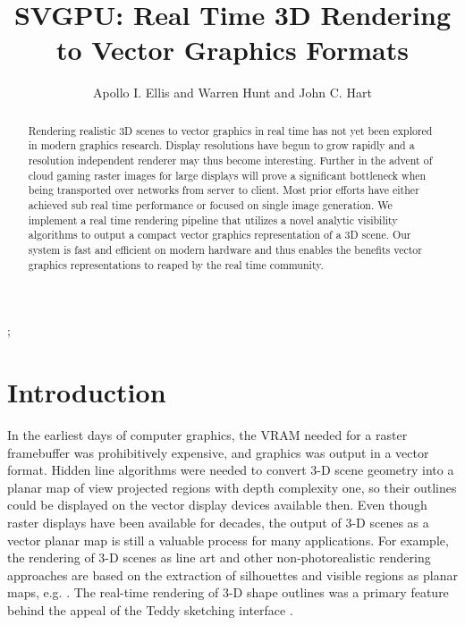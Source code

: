 \documentclass[review]{acmsiggraph}
\title{SVGPU: Real Time 3D Rendering to Vector Graphics Formats}
\author{Apollo I. Ellis and Warren Hunt and John C. Hart}
\begin{document}

 \teaser{
 }

\maketitle

\begin{abstract}

Rendering realistic 3D scenes to vector graphics in real time has not yet been explored in modern graphics research. Display resolutions have begun to grow rapidly and a resolution independent renderer may thus become interesting. Further in the advent of cloud gaming raster images for large displays will prove a significant bottleneck when being transported over networks from server to client.  Most prior efforts have either achieved sub real time performance or focused on single image generation. We implement a real time rendering pipeline that utilizes a novel analytic visibility algorithms to output a compact vector graphics representation of a 3D scene. Our system is fast and efficient on modern hardware and thus enables the benefits vector graphics representations to reaped by the real time community.

\end{abstract}

\begin{CRcatlist}
  ;
\end{CRcatlist}

\keywordlist


\copyrightspace

\section{Introduction}
In the earliest days of computer graphics, the VRAM needed for a raster
framebuffer was prohibitively expensive, and graphics was output in a vector
format. Hidden line algorithms were needed to convert 3-D scene geometry into
a planar map of view projected regions with depth complexity one, so their
outlines could be displayed on the vector display devices available then. Even
though raster displays have been available for decades, the output of 3-D
scenes as a vector planar map is still a valuable process for many
applications. For example, the rendering of 3-D scenes as line art and other
non-photorealistic rendering approaches are based on the extraction of
silhouettes and visible regions as planar maps, e.g. \cite{lineart,npr}. The
real-time rendering of 3-D shape outlines was a primary feature behind the
appeal of the Teddy sketching interface \cite{igarashi1999}.
\end{document}
